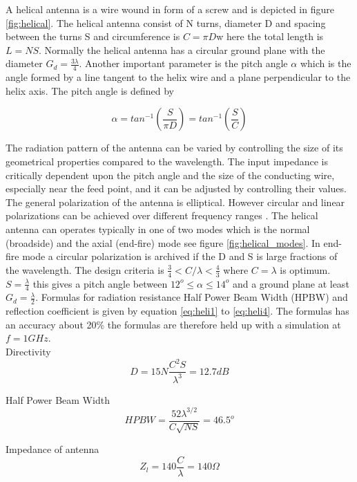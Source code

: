 A helical antenna is a wire wound in form of a screw and is depicted in figure \ref{fig:helical}. The helical antenna consist of N turns, diameter D and spacing between the turns S and circumference is $C = \pi D$w here the total length is $L = NS$. Normally the helical antenna has a circular ground plane with the diameter $G_d = \frac{3\lambda}{4}$. Another important parameter is the pitch angle $\alpha$ which is the angle formed by a line tangent to the helix wire and a plane perpendicular to the helix axis. The pitch angle is defined by   

\begin{equation}
\alpha = tan^{-1}(\frac{S}{\pi D}) = tan^{-1}(\frac{S}{C})
\end{equation} 

The radiation pattern of the antenna can be varied by controlling the size of its
geometrical properties compared to the wavelength. The input impedance is critically
dependent upon the pitch angle and the size of the conducting wire, especially near the
feed point, and it can be adjusted by controlling their values. The general polarization
of the antenna is elliptical. However circular and linear polarizations can be achieved
over different frequency ranges \citep{Balanis2005}. The helical antenna can operates typically in one of two modes which is
the normal (broadside) and the axial (end-fire) mode see figure \ref{fig:helical_modes}. In end-fire mode a circular polarization is archived if the D and S is large fractions of the wavelength. The design criteria is $\frac{3}{4} < C/\lambda < \frac{4}{3}$ where $C = \lambda$ is optimum. $S = \frac{\lambda}{4}$ this gives a pitch angle between $12^o \leq \alpha \leq 14^o $ and a ground plane at least $G_d = \frac{\lambda}{2}$. Formulas for radiation resistance Half Power Beam Width (HPBW) and reflection coefficient is given by equation \ref{eq:heli1} to \ref{eq:heli4}. The formulas has an accuracy about 20\% the formulas are therefore held up with a simulation at $f = 1GHz$.\\

Directivity
\begin{equation}
D =  15N\frac{C^2 S}{\lambda^3} = 12.7dB
\end{equation}  
\label{eq:heli1}

Half Power Beam Width
\begin{equation}
HPBW = \frac{52\lambda^{3/2} }{C\sqrt{NS}} = 46.5^o
\end{equation}  
\label{eq:heli2}

Impedance of antenna 
\begin{equation}
Z_l = 140\frac{C}{\lambda} = 140\Omega
\end{equation} 
\label{eq:heli3}
 
